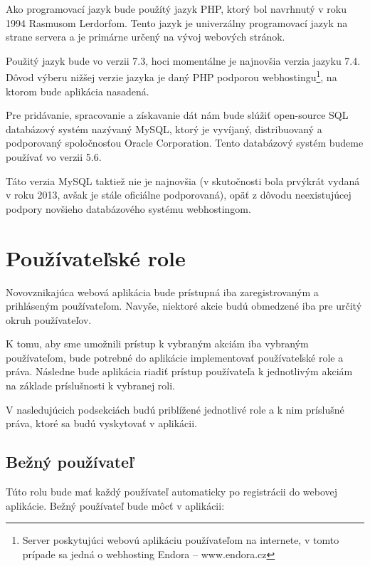 Ako programovací jazyk bude použítý jazyk PHP, ktorý bol navrhnutý v roku 1994 Rasmusom Lerdorfom. Tento jazyk je univerzálny programovací jazyk na strane servera a je primárne určený na vývoj webových stránok.\cite{co-je-php}

Použitý jazyk bude vo verzii 7.3, hoci momentálne je najnovšia verzia jazyku 7.4\cite{verzie-php}.
Dôvod výberu nižšej verzie jazyka je daný PHP podporou webhostingu\footnote{Server poskytujúci webovú aplikáciu používateľom na internete, v tomto prípade sa jedná o webhosting Endora -- www.endora.cz}, na ktorom bude aplikácia nasadená.

Pre pridávanie, spracovanie a získavanie dát nám bude slúžiť open-source SQL databázový systém nazývaný MySQL, ktorý je vyvíjaný, distribuovaný a podporovaný spoločnosťou Oracle Corporation\cite{co-je-mysql}. Tento databázový systém budeme používať vo verzii 5.6.

Táto verzia MySQL taktiež nie je najnovšia (v skutočnosti bola prvýkrát vydaná v roku 2013, avšak je stále oficiálne podporovaná\cite{verzie-mysql}), opäť z dôvodu neexistujúcej podpory novšieho databázového systému webhostingom.

\section{Používateľské role}\label{pouzivatelske-role}
Novovznikajúca webová aplikácia bude prístupná iba zaregistrovaným a prihláseným používateľom. Navyše, niektoré akcie budú obmedzené iba pre určitý okruh používateľov.

K tomu, aby sme umožnili prístup k vybraným akciám iba vybraným používateľom, bude potrebné do aplikácie implementovať používateľské role a práva. Následne bude aplikácia riadiť prístup používateľa k jednotlivým akciám na základe príslušnosti k vybranej roli.

V nasledujúcich podsekciách budú priblížené jednotlivé role a k nim príslušné práva, ktoré sa budú vyskytovať v aplikácii.

\subsection{Bežný používateľ}\label{bezny-pouzivatel}
Túto rolu bude mať každý používateľ automaticky po registrácii do webovej aplikácie. Bežný používateľ bude môcť v aplikácii: 


